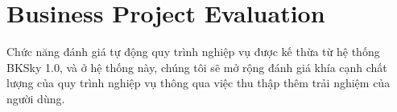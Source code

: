 \section{Business Project Evaluation}
Chức năng đánh giá tự động quy trình nghiệp vụ được kế thừa từ hệ thống BKSky 1.0, và ở hệ thống này,
chúng tôi sẽ mở rộng đánh giá khía cạnh chất lượng của quy trình nghiệp vụ thông qua việc thu thập thêm
trải nghiệm của người dùng.






